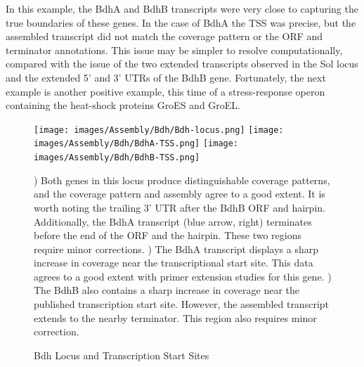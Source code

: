In this example, the BdhA and BdhB transcripts were very close to capturing the true boundaries of these genes. In the case of BdhA the TSS was precise, but the assembled transcript did not match the coverage pattern or the ORF and terminator annotations. This issue may be simpler to resolve computationally, compared with the issue of the two extended transcripts observed in the Sol locus and the extended 5' and 3' UTRs of the BdhB gene. Fortunately, the next example is another positive example, this time of a stress-response operon containing the heat-shock proteins GroES and GroEL.
\begin{figure}
\small
{\texttt{[image: images/Assembly/Bdh/Bdh-locus.png]}
\label{fig:4a}}
{\texttt{[image: images/Assembly/Bdh/BdhA-TSS.png]}
\label{fig:4b}}
{\texttt{[image: images/Assembly/Bdh/BdhB-TSS.png]}
\label{fig:4c}}
\caption{Bdh Locus and Transcription Start Sites}
) Both genes in this locus produce distinguishable coverage patterns, and the coverage pattern and assembly agree to a good extent. It is worth noting the trailing 3' UTR after the BdhB ORF and hairpin. Additionally, the BdhA transcript (blue arrow, right) terminates before the end of the ORF and the hairpin. These two regions require minor corrections. ) The BdhA transcript displays a sharp increase in coverage near the transcriptional start site. This data agrees to a good extent with primer extension studies for this gene. ) The BdhB also contains a sharp increase in coverage near the published transcription start site. However, the assembled transcript extends to the nearby terminator. This region also requires minor correction.
\end{figure}

